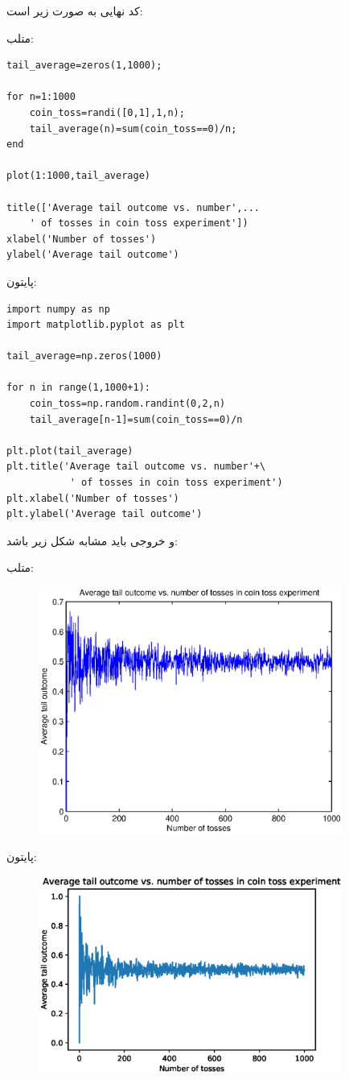 \documentclass{article}
\begin{document}
کد نهایی به صورت زیر است:

متلب:

\begin{latin}
\begin{verbatim}
tail_average=zeros(1,1000);

for n=1:1000
    coin_toss=randi([0,1],1,n);
    tail_average(n)=sum(coin_toss==0)/n;
end

plot(1:1000,tail_average)

title(['Average tail outcome vs. number',...
    ' of tosses in coin toss experiment'])
xlabel('Number of tosses')
ylabel('Average tail outcome')
\end{verbatim}
\end{latin}
پایتون:
\begin{latin}
\begin{verbatim}
import numpy as np
import matplotlib.pyplot as plt

tail_average=np.zeros(1000)

for n in range(1,1000+1):
    coin_toss=np.random.randint(0,2,n)
    tail_average[n-1]=sum(coin_toss==0)/n
    
plt.plot(tail_average)
plt.title('Average tail outcome vs. number'+\
           ' of tosses in coin toss experiment')
plt.xlabel('Number of tosses')
plt.ylabel('Average tail outcome')
\end{verbatim}
\end{latin}

و خروجی باید مشابه شکل زیر باشد:

\newpage

متلب:

\begin{figure}[h]
\centering
\includegraphics[width=100mm]{resultmat.eps}
\end{figure}

پایتون:
\begin{figure}[h]
\centering
\includegraphics[width=100mm]{resultpy.eps}
\end{figure}
\end{document}
